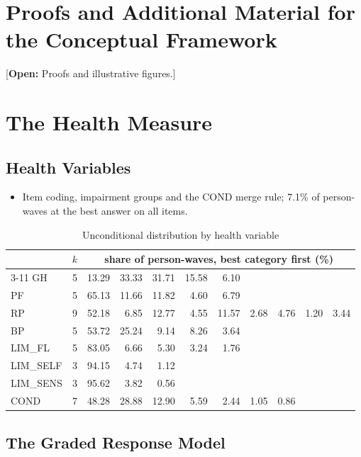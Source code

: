 \documentclass[11pt]{article}
\newcommand{\open}[1]{\textcolor{red!75!black}{\small[\textbf{Open:} #1]}}
\begin{document}
\section{Proofs and Additional Material for the Conceptual Framework}
\label{app:conceptual}
\open{Proofs and illustrative figures.}

\section{The Health Measure}
\label{app:health}

\subsection{Health Variables} \label{app:health_vars}
\begin{itemize}
	\item Item coding, impairment groups and the COND merge rule; 7.1\% of person-waves at the best answer on all items.
\end{itemize}

\begin{table}[H]
	\caption{Unconditional distribution by health variable}
	\label{tab:uncond_health_var}
	\centering\small
	\begin{tabular}{lr rrrrrrrrr}
		\toprule
		& $k$ & \multicolumn{9}{c}{share of person-waves, best category first (\%)} \\
		\cmidrule(l){3-11}
		GH & 5 & 13.29 & 33.33 & 31.71 & 15.58 & 6.10 & & & & \\
		PF & 5 & 65.13 & 11.66 & 11.82 & 4.60 & 6.79 & & & & \\
		RP & 9 & 52.18 & 6.85 & 12.77 & 4.55 & 11.57 & 2.68 & 4.76 & 1.20 & 3.44 \\
		BP & 5 & 53.72 & 25.24 & 9.14 & 8.26 & 3.64 & & & & \\
		LIM\_FL & 5 & 83.05 & 6.66 & 5.30 & 3.24 & 1.76 & & & & \\
		LIM\_SELF & 3 & 94.15 & 4.74 & 1.12 & & & & & & \\
		LIM\_SENS & 3 & 95.62 & 3.82 & 0.56 & & & & & & \\
		COND & 7 & 48.28 & 28.88 & 12.90 & 5.59 & 2.44 & 1.05 & 0.86 & & \\
		\bottomrule
	\end{tabular}
\end{table}

\subsection{The Graded Response Model} \label{app:grm_details}
\end{document}
